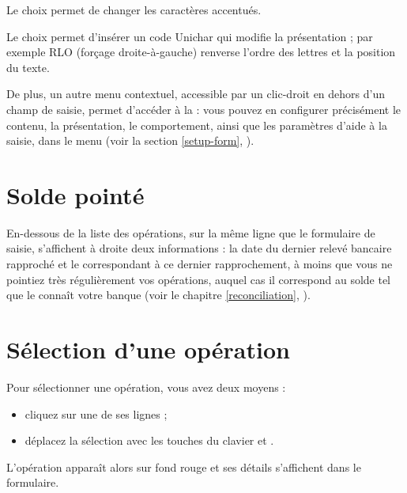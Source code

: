 Le choix  permet de changer les caractères accentués.

Le choix  permet d'insérer un code Unichar qui modifie la présentation ; par exemple RLO (forçage droite-à-gauche) renverse l'ordre des lettres et la position du texte.

De plus, un autre menu contextuel, accessible par un clic-droit en dehors d'un champ de saisie, permet d'accéder à la  : vous pouvez en configurer précisément le contenu, la présentation, le comportement, ainsi que les paramètres d'aide à la saisie, dans le menu  (voir la section \vref{setup-form}, ).


\section{Solde pointé\label{transactions-balance}}


En-dessous de la liste des opérations, sur la même ligne que le formulaire de saisie, s'affichent à droite deux informations  : la date du dernier relevé bancaire rapproché et le  correspondant à ce dernier rapprochement, à moins que vous ne pointiez très régulièrement vos opérations, auquel cas il correspond au solde tel que le connaît votre banque (voir le chapitre \vref{reconciliation}, ).

\ifIllustration
\newpage
\else
\fi


\section{Sélection d'une opération \label{transactions-selection}}


Pour sélectionner une opération, vous avez deux moyens :

\begin{itemize}
	 \item cliquez sur une de ses lignes ;
	 \item déplacez la sélection avec les touches du clavier  et .
\end{itemize}

L'opération apparaît alors sur fond rouge{\couleur} et ses détails s'affichent dans le formulaire.

